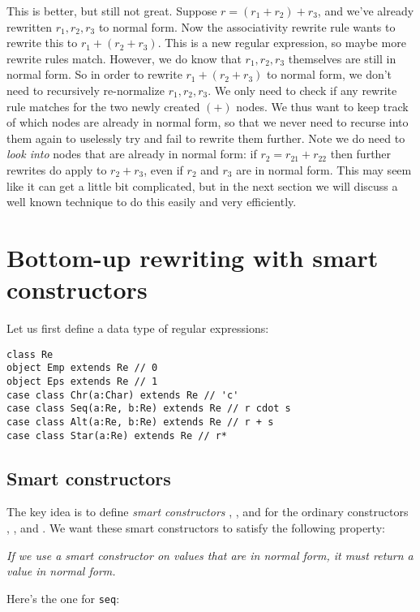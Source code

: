 This is better, but still not great. Suppose $r = (r_1 + r_2) + r_3$, and we've already rewritten $r_1,r_2,r_3$ to normal form. Now the associativity rewrite rule wants to rewrite this to $r_1 + (r_2 + r_3)$. This is a new regular expression, so maybe more rewrite rules match. However, we do know that $r_1, r_2, r_3$ themselves are still in normal form. So in order to rewrite $r_1 + (r_2 + r_3)$ to normal form, we don't need to recursively re-normalize $r_1, r_2, r_3$. We only need to check if any rewrite rule matches for the two newly created $(+)$ nodes. We thus want to keep track of which nodes are already in normal form, so that we never need to recurse into them again to uselessly try and fail to rewrite them further. Note we do need to \emph{look into} nodes that are already in normal form: if $r_2 = r_{21} + r_{22}$ then further rewrites do apply to $r_2 + r_3$, even if $r_2$ and $r_3$ are in normal form. This may seem like it can get a little bit complicated, but in the next section we will discuss a well known technique to do this easily and very efficiently.



\section{Bottom-up rewriting with smart constructors}

Let us first define a data type of regular expressions:

\begin{lstlisting}
class Re
object Emp extends Re // 0
object Eps extends Re // 1
case class Chr(a:Char) extends Re // 'c'
case class Seq(a:Re, b:Re) extends Re // r cdot s
case class Alt(a:Re, b:Re) extends Re // r + s
case class Star(a:Re) extends Re // r*
\end{lstlisting}

\subsection{Smart constructors}

The key idea is to define \emph{smart constructors} , , and  for the ordinary constructors , , and . We want these smart constructors to satisfy the following property:

\emph{If we use a smart constructor on values that are in normal form, it must return a value in normal form.}

Here's the one for \lstinline|seq|:

